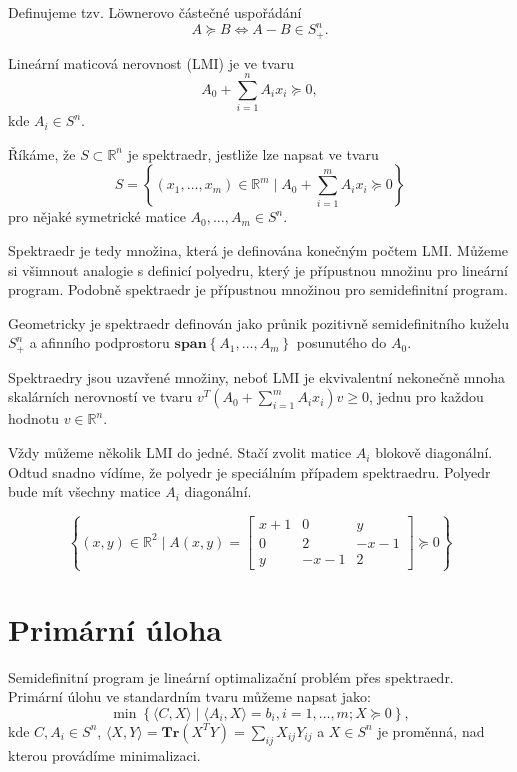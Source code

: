Definujeme tzv. L\"{o}wnerovo částečné uspořádání
$$
    A \succeq B \iff A - B \in S_+^n.
$$

\begin{df}
    Lineární maticová nerovnost (LMI) je ve tvaru
    $$
        A_0 + \sum_{i=1}^n A_i x_i \succeq 0,
    $$
    kde $A_i \in S^n$.
\end{df}

\begin{df}
    Říkáme, že $S \subset \mathbb{R}^n$ je spektraedr, jestliže lze napsat ve tvaru
    $$
        S = \left\{ (x_1, \dots, x_m) \in \mathbb{R}^m \mid A_0 + \sum_{i=1}^m A_i x_i \succeq 0 \right\}
    $$
    pro nějaké symetrické matice $A_0, \dots, A_m \in S^n$.
\end{df}

Spektraedr je tedy množina, která je definována konečným počtem LMI. Můžeme si všimnout analogie s definicí polyedru, který je přípustnou množinu pro lineární program. Podobně spektraedr je přípustnou množinou pro semidefinitní program.

Geometricky je spektraedr definován jako průnik pozitivně semidefinitního kuželu $S_+^n$ a afinního podprostoru $\textbf{span}\left\{ A_1, \dots, A_m \right\}$ posunutého do $A_0$.

Spektraedry jsou uzavřené množiny, neboť LMI je ekvivalentní nekonečně mnoha skalárních nerovností ve tvaru $v^T(A_0 + \sum_{i=1}^m A_ix_i)v \geq 0$, jednu pro každou hodnotu $v \in \mathbb{R}^n$.

Vždy můžeme několik LMI  do jedné. Stačí zvolit matice $A_i$ blokově diagonální. Odtud snadno vídíme, že polyedr je speciálním případem spektraedru. Polyedr bude mít všechny matice $A_i$ diagonální.

\begin{pr}
    $$
        \left\{ (x, y) \in \mathbb{R}^2 \mid A(x,y) =
        \begin{bmatrix}
            x + 1 & 0      & y \\
            0     & 2      & -x - 1 \\
            y     & -x - 1 & 2
        \end{bmatrix}
        \succeq 0 \right\}
    $$
\end{pr}

\section{Primární úloha}

Semidefinitní program je lineární optimalizační problém přes spektraedr. Primární úlohu ve standardním tvaru můžeme napsat jako:
\begin{equation}\tag{SDP-P}
    \min \left\{ \langle C, X \rangle \mid \langle A_i, X \rangle = b_i, i=1, \dots, m; X \succeq 0 \right\},
    \label{eq:SDP-P}
\end{equation}
kde $C, A_i \in S^n$, $\langle X, Y \rangle = \textbf{Tr}(X^T Y) = \sum_{ij} X_{ij}Y_{ij}$ a $X \in S^n$ je proměnná, nad kterou provádíme minimalizaci.

